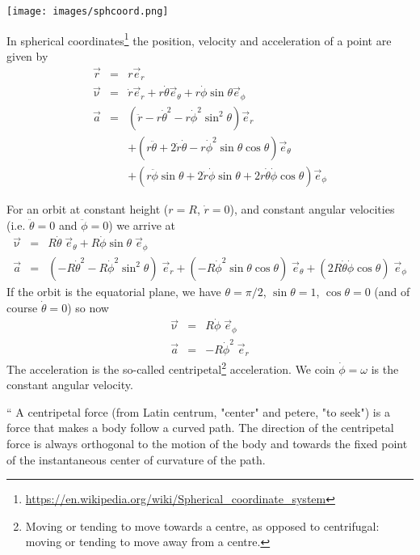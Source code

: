 
\begin{center}
\texttt{[image: images/sphcoord.png]}
\end{center}

In spherical coordinates\footnote{\url{https://en.wikipedia.org/wiki/Spherical_coordinate_system}}
the position, velocity and acceleration of a point are given by
\begin{eqnarray}
\vec{r} &=& r \vec{e}_r \nonumber\\
\vec{\upnu} &=& \dot{r} \vec{e}_r + r \dot\theta   \vec{e}_\theta + r \dot{\phi}  \sin\theta \vec{e}_\phi \nonumber\\
\vec{a} &=& 
(\ddot{r} - r \dot{\theta}^2  - r \dot{\phi}^2 \sin^2 \theta )\vec{e}_r \nonumber\\
&&+(r \ddot\theta + 2 \dot{r} \dot{\theta} - r \dot{\phi}^2 \sin\theta \cos \theta) \vec{e}_\theta  \nonumber\\
&&+(r \ddot{\phi} \sin\theta + 2 \dot{r}\dot{\phi} \sin\theta + 2r \dot{\theta} \dot{\phi} \cos\theta)
\vec{e}_\phi \nonumber
\end{eqnarray}

For an orbit at constant height ($r=R$, $\dot{r}=0$), and constant angular velocities (i.e. $\ddot{\theta}=0$ 
and $\ddot{\phi}=0$) we arrive at
\begin{eqnarray}
\vec{\upnu} &=&  R \dot\theta  \; \vec{e}_\theta + R \dot{\phi}  \sin\theta \; \vec{e}_\phi \\
\vec{a} &=& 
( - R \dot{\theta}^2  - R \dot{\phi}^2 \sin^2 \theta ) \;\vec{e}_r 
+(   - R \dot{\phi}^2 \sin\theta \cos \theta) \; \vec{e}_\theta 
+( 2R \dot{\theta} \dot{\phi} \cos\theta)  \;\vec{e}_\phi
\end{eqnarray}
If the orbit is the equatorial plane, we have $\theta=\pi/2$, $\sin\theta=1$, $\cos\theta=0$ (and of course $\dot\theta=0$) so now
\begin{eqnarray}
\vec{\upnu} &=&   R \dot{\phi} \; \vec{e}_\phi \\
\vec{a} &=&    - R \dot{\phi}^2  \; \vec{e}_r 
\end{eqnarray}
The acceleration is the so-called centripetal\footnote{Moving or tending to move towards a centre, as opposed to centrifugal:     moving or tending to move away from a centre.} acceleration. 
We coin $\dot{\phi}=\omega$ is the constant angular velocity.

 
`` A centripetal force (from Latin centrum, "center" and petere, "to seek") is a force that makes a body follow a curved path. The direction of the centripetal force is always orthogonal to the motion of the body and towards the fixed point of the instantaneous center of curvature of the path. 


